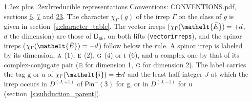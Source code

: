 \documentclass[10pt,a4paper]{article}
\makeatletter
\renewcommand\section{\@startsection{section}{1}{\z@}{-3ex plus -1ex minus -.2ex}%
  {1.2ex plus .2ex}{\normalfont\large\sffamily\bfseries\color{parttitle}}}
\numberwithin{equation}{section}
\newcommand{\eltfont}[1]{{\let\sigma\eltsigma\mathelt{#1}}}
\newcommand{\grp}[1]{\mathsf{#1}}
\newcommand{\irr}[1]{\text{\normalfont\scshape #1}}
\newcommand{\elt}[1]{\eltfont{#1}}
\newcommand{\ptag}[1]{\mathrm{#1}}
\newcommand{\irrJp}[2]{D^{(#1,#2)}}
\newcommand{\irchar}[1]{\chi_{#1}}
\newcommand{\barred}[1]{\bar{#1}}
\newcommand{\lift}[1]{\tilde{#1}}
\makeatother
\begin{document}
\section{Irreducible representations}\label{s:irreps}
Conventions: \href{../../CONVENTIONS.pdf}{CONVENTIONS.pdf}, sections \href{../../../rotation/CONVENTIONS.pdf\#conv.6}{6}, \href{../../../rotation/CONVENTIONS.pdf\#conv.7}{7} and \href{../../CONVENTIONS.pdf\#conv.23}{23}.
\leavevmode\label{n:function.character}\label{n:irrep.Gamma}The character $\irchar{\Gamma}(g)$ of the irrep $\Gamma$ on the class of $g$ is given in section~\ref{s:character_table}. \label{n:index.dimension}The vector irreps ($\irchar{\Gamma}(\elt{\barred{E}}) = +d$, $d$ the dimension) are those of \href{../../../rotation/data/pdf/D4h.pdf}{$\grp{D_{4h}}$}, on both lifts (\texttt{vectorirreps}), and the spinor irreps ($\irchar{\Gamma}(\elt{\barred{E}}) = -d$) follow below the rule. A spinor irrep is labeled by its dimension, $\irr{a}$ (1), $\irr{e}$ (2), $\irr{g}$ (4) or $\irr{i}$ (6), and a complex one by that of its complex-conjugate pair ($\irr{e}$ for dimension 1, $\irr{g}$ for dimension 2). The label carries the tag $\ptag{g}$ or $\ptag{u}$ of $\irchar{\Gamma}(\elt{\lift{i}}) = \pm d$ and the least half-integer $J$ at which the irrep occurs in $\irrJp{J}{+1}$ of $\grp{Pin^{-}(3)}$ for $\ptag{g}$, or in $\irrJp{J}{-1}$ for $\ptag{u}$ (section~\ref{s:subduction_parent}).
\end{document}
